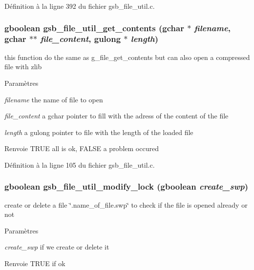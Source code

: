 Définition à la ligne 392 du fichier gsb\_\-file\_\-util.c.

\subsubsection[{gsb\_\-file\_\-util\_\-get\_\-contents}]{\setlength{\rightskip}{0pt plus 5cm}gboolean gsb\_\-file\_\-util\_\-get\_\-contents (gchar $\ast$ {\em filename}, \/  gchar $\ast$$\ast$ {\em file\_\-content}, \/  gulong $\ast$ {\em length})}\label{gsb__file__util_8h_aa976d6f0795a4f897ac1092f95ca247c}
this function do the same as g\_\-file\_\-get\_\-contents but can also open a compressed file with zlib


\begin{DoxyParams}{Paramètres}
\item[{\em filename}]the name of file to open \item[{\em file\_\-content}]a gchar pointer to fill with the adress of the content of the file \item[{\em length}]a gulong pointer to file with the length of the loaded file\end{DoxyParams}
\begin{DoxyReturn}{Renvoie}
TRUE all is ok, FALSE a problem occured 
\end{DoxyReturn}


Définition à la ligne 105 du fichier gsb\_\-file\_\-util.c.

\subsubsection[{gsb\_\-file\_\-util\_\-modify\_\-lock}]{\setlength{\rightskip}{0pt plus 5cm}gboolean gsb\_\-file\_\-util\_\-modify\_\-lock (gboolean {\em create\_\-swp})}\label{gsb__file__util_8h_a80670d5f3bf53ded5ead442f5c6d1be0}
create or delete a file \char`\"{}.name\_\-of\_\-file.swp\char`\"{} to check if the file is opened already or not


\begin{DoxyParams}{Paramètres}
\item[{\em create\_\-swp}]if we create or delete it\end{DoxyParams}
\begin{DoxyReturn}{Renvoie}
TRUE if ok 
\end{DoxyReturn}


